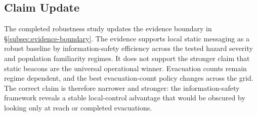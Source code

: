 \subsection{Claim Update}
\label{subsec:robustness-decision-criteria}

The completed robustness study updates the evidence boundary in
\S\ref{subsec:evidence-boundary}. The evidence supports local static messaging
as a robust baseline by information-safety efficiency across the tested hazard
severity and population familiarity regimes. It does not support the stronger claim
that static beacons are the universal operational winner. Evacuation counts
remain regime dependent, and the best evacuation-count policy changes across
the grid. The correct claim is therefore narrower and stronger: the
information-safety framework reveals a stable local-control advantage that
would be obscured by looking only at reach or completed evacuations.
